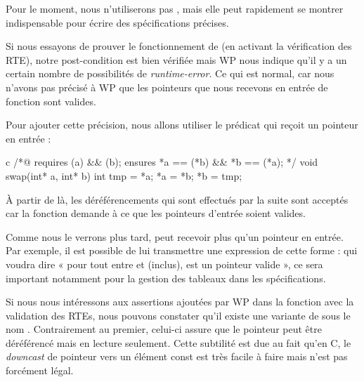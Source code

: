 Pour le moment, nous n'utiliserons pas , mais elle peut rapidement se
montrer indispensable pour écrire des spécifications précises.





Si nous essayons de prouver le fonctionnement de  (en activant
la vérification des RTE), notre post-condition est bien vérifiée mais WP nous 
indique qu'il y a un certain nombre de possibilités de \textit{runtime-error}. Ce qui 
est normal, car nous n'avons pas précisé à WP que les pointeurs que nous
recevons en entrée de fonction sont valides.



Pour ajouter cette précision, nous allons utiliser le prédicat  qui
reçoit un pointeur en entrée :



\begin{CodeBlock}{c}
/*@
  requires \valid(a) && \valid(b);
  ensures  *a == \old(*b) && *b == \old(*a);
*/
void swap(int* a, int* b){
  int tmp = *a;
  *a = *b;
  *b = tmp;
}
\end{CodeBlock}



À partir de là, les déréférencements qui sont effectués par la suite sont 
acceptés car la fonction demande à ce que les pointeurs d'entrée soient 
valides.



Comme nous le verrons plus tard,  peut recevoir plus qu'un 
pointeur en entrée. Par exemple, il est possible de lui transmettre une 
expression de cette forme :  qui voudra dire « pour
tout  entre  et  (inclus),  est un pointeur valide », ce sera important 
notamment pour la gestion des tableaux dans les spécifications.



Si nous nous intéressons aux assertions ajoutées par WP dans la fonction 
avec la validation des RTEs, nous pouvons constater qu'il existe une variante
de  sous le nom . Contrairement au premier, 
celui-ci assure que le pointeur peut être déréférencé mais en lecture 
seulement. Cette subtilité est due au fait qu'en C, le \textit{downcast} de pointeur 
vers un élément const est très facile à faire mais n'est pas forcément légal.



